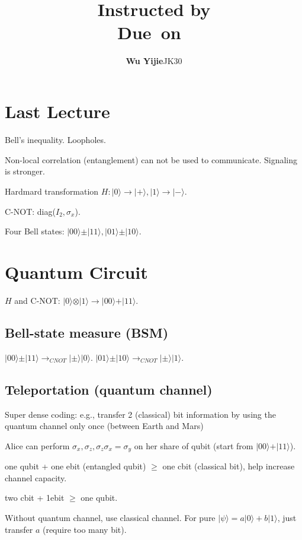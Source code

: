 \documentclass{article}
\title{\textmd{\bf \Class\\ \Title}\\{\large Instructed by \textit{\ClassInstructor}}\\\normalsize\vspace{0.1in}\small{Due\ on\ \DueDate}}
\date{}
\newcommand{\StudentName}{Wu Yijie}
\newcommand{\StudentClass}{JK30}
\newcommand{\StudentNumber}{2013011314}
\newcommand{\ket}[1]{\vert #1\rangle}
\begin{document}
\begin{spacing}{1.2}
\author{\textbf{\StudentName}\qquad\StudentClass\quad\StudentNumber}
\maketitle \thispagestyle{empty}
\section{Last Lecture}
Bell's inequality. Loopholes.

Non-local correlation (entanglement) can not be used to communicate. Signaling is stronger.

Hardmard transformation $H: \ket{0}\to \ket{+}, \ket{1}\to\ket{-}$.

C-NOT: diag($I_2,\sigma_x$).

Four Bell states: $\ket{00}\pm\ket{11},\ket{01}\pm\ket{10}$.

\section{Quantum Circuit}
$H$ and C-NOT: $\ket0 \otimes \ket1 \to \ket{00}+\ket{11}$.

\subsection{Bell-state measure (BSM)}
$\ket{00}\pm\ket{11}\to_{CNOT}\ket{\pm}\ket0$. $\ket{01}\pm\ket{10}\to_{CNOT}\ket{\pm}\ket{1}$.

\subsection{Teleportation (quantum channel)}
Super dense coding: e.g., transfer 2 (classical) bit information by using the quantum channel only once (between Earth and Mars)

Alice can perform $\sigma_x,\sigma_z, \sigma_z\sigma_x=\sigma_y$ on her share of qubit (start from $\ket{00}+\ket{11}$).

one qubit + one ebit (entangled qubit) $\geq$ one cbit (classical bit), help increase channel capacity.

two cbit + 1ebit $\geq$ one qubit.

Without quantum channel, use classical channel. For pure $\ket{\psi} = a\ket0 +b\ket1$, just transfer $a$ (require too many bit).


\end{spacing}
\end{document}
